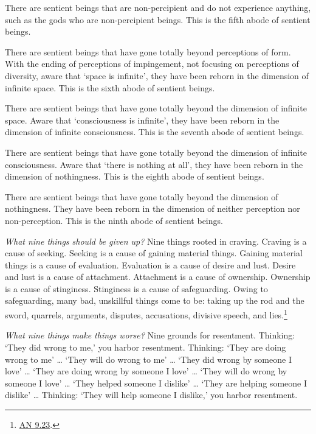 \documentclass[12pt,openany]{book}%
\begin{document}
There are sentient beings that are non-percipient and do not experience anything, such as the gods who are non-percipient beings. This is the fifth abode of sentient beings. 

There are sentient beings that have gone totally beyond perceptions of form. With the ending of perceptions of impingement, not focusing on perceptions of diversity, aware that ‘space is infinite’, they have been reborn in the dimension of infinite space. This is the sixth abode of sentient beings. 

There are sentient beings that have gone totally beyond the dimension of infinite space. Aware that ‘consciousness is infinite’, they have been reborn in the dimension of infinite consciousness. This is the seventh abode of sentient beings. 

There are sentient beings that have gone totally beyond the dimension of infinite consciousness. Aware that ‘there is nothing at all’, they have been reborn in the dimension of nothingness. This is the eighth abode of sentient beings. 

There are sentient beings that have gone totally beyond the dimension of nothingness. They have been reborn in the dimension of neither perception nor non-perception. This is the ninth abode of sentient beings. 

\emph{What nine things should be given up?} Nine things rooted in craving. Craving is a cause of seeking. Seeking is a cause of gaining material things. Gaining material things is a cause of evaluation. Evaluation is a cause of desire and lust. Desire and lust is a cause of attachment. Attachment is a cause of ownership. Ownership is a cause of stinginess. Stinginess is a cause of safeguarding. Owing to safeguarding, many bad, unskillful things come to be: taking up the rod and the sword, quarrels, arguments, disputes, accusations, divisive speech, and lies.\footnote{\href{https://suttacentral.net/an9.23/en/sujato}{AN 9.23}. } 

\emph{What nine things make things worse?} Nine grounds for resentment. Thinking: ‘They did wrong to me,’ you harbor resentment. Thinking: ‘They are doing wrong to me’ … ‘They will do wrong to me’ … ‘They did wrong by someone I love’ … ‘They are doing wrong by someone I love’ … ‘They will do wrong by someone I love’ … ‘They helped someone I dislike’ … ‘They are helping someone I dislike’ … Thinking: ‘They will help someone I dislike,’ you harbor resentment. 
\end{document}

